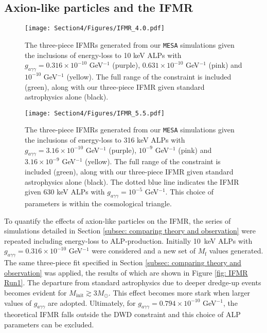 \subsection{Axion-like particles and the IFMR}
\label{sec: ALPs and the IFMR}


\begin{figure}[t]
\centering
\begin{minipage}[t]{.5\textwidth}
    \centering
    \captionsetup{width=0.9\textwidth}
    \texttt{[image: Section4/Figures/IFMR\_4.0.pdf]}
    \caption{The three-piece IFMRs generated from our \texttt{MESA} simulations given the inclusions of energy-loss to 10 keV ALPs with $g_{a\gamma\gamma}=0.316\times10^{-10}$ GeV$^{-1}$ (purple), $0.631\times10^{-10}$ GeV$^{-1}$ (pink) and $10^{-10}$ GeV$^{-1}$ (yellow). The full range of the constraint \cite{Andrews} is included (green), along with our three-piece IFMR given standard astrophysics alone (black).}
    \label{fig: IFMR Run1}
\end{minipage}%
\begin{minipage}[t]{.5\textwidth}
    \centering
    \captionsetup{width=0.9\textwidth}
    \texttt{[image: Section4/Figures/IFMR\_5.5.pdf]}
    \caption{The three-piece IFMRs generated from our \texttt{MESA} simulations given the inclusions of energy-loss to 316 keV ALPs with $g_{a\gamma\gamma}=3.16\times10^{-10}$ GeV$^{-1}$ (purple), $10^{-9}$ GeV$^{-1}$ (pink) and $3.16\times10^{-9}$ GeV$^{-1}$ (yellow).  The full range of the constraint \cite{Andrews} is included (green), along with our three-piece IFMR given standard astrophysics alone (black). The dotted blue line indicates the IFMR given 630 keV ALPs with $g_{a\gamma\gamma}=10^{-5}$ GeV$^{-1}$. This choice of parameters is within the cosmological triangle.}
    \label{fig: IFMR Run2}
\end{minipage}
\end{figure}

To quantify the effects of axion-like particles on the IFMR, the series of simulations detailed in Section \ref{subsec: comparing theory and observation} were repeated including energy-loss to ALP-production. Initially 10~keV ALPs with $g_{a\gamma\gamma}=0.316\times10^{-10}$ GeV$^{-1}$ were considered and a new set of $M_{\mathrm{f}}$ values generated. The same three-piece fit specified in Section \ref{subsec: comparing theory and observation} was applied, the results of which are shown in Figure \ref{fig: IFMR Run1}. The departure from standard astrophysics due to deeper dredge-up events becomes evident for $M_{\mathrm{init}}\gtrsim3M_{\odot}$. This effect becomes more stark when larger values of $g_{a\gamma\gamma}$ are adopted. Ultimately, for $g_{a\gamma\gamma}=0.794\times10^{-10}$ GeV$^{-1}$, the theoretical IFMR falls outside the DWD constraint and this choice of ALP parameters can be excluded.


